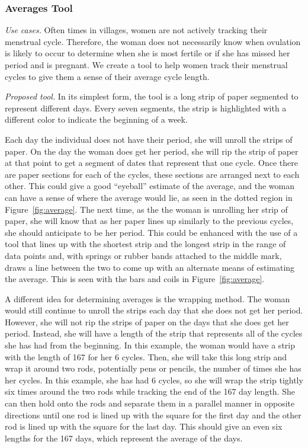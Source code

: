 \documentclass{sig-alternate}
\begin{document}
\subsubsection{Averages Tool}
\label{sec:average}

\emph{Use cases.} 
Often times in villages, women are not actively tracking their menstrual cycle. Therefore, the woman does not necessarily know when ovulation is likely to occur to determine when she is most fertile or if she has missed her period and is pregnant. We create a tool to help women track their menstrual cycles to give them a sense of their average cycle length.

\emph{Proposed tool.}
In its simplest form, the tool is a long strip of paper segmented to represent different days. Every seven segments, the strip is highlighted with a different color to indicate the beginning of a week.

Each day the individual does not have their period, she will unroll the strips of paper. 
On the day the woman does get her period, she will rip the strip of paper at that point to get a segment of dates that represent that one cycle. Once there are paper sections for each of the cycles, these sections are arranged next to each other. This could give a good ``eyeball'' estimate of the average, and the woman can have a sense of where the average would lie, as seen in the dotted region in Figure~\ref{fig:average}. The next time, as the the woman is unrolling her strip of paper, she will know that as her paper lines up similarly to the previous cycles, she should anticipate to be her period. This could be enhanced with the use of a tool that lines up with the shortest strip and the longest strip in the range of data points and, with springs or rubber bands attached to the middle mark, draws a line between the two to come up with an alternate means of estimating the average. This is seen with the bars and coils in Figure~\ref{fig:average}.

A different idea for determining averages is the wrapping method. The woman would still continue to unroll the strips each day that she does not get her period. However, she will not rip the strips of paper on the days that she does get her period. Instead, she will have a length of the strip that represents all of the cycles she has had from the beginning. In this example, the woman would have a strip with the length of 167 for her 6 cycles. Then, she will take this long strip and wrap it around two rods, potentially pens or pencils, the number of times she has her cycles. In this example, she has had 6 cycles, so she will wrap the strip tightly six times around the two rods while tracking the end of the 167 day length. She can then hold onto the rods and separate them in a parallel manner in opposite directions until one rod is lined up with the square for the first day and the other rod is lined up with the square for the last day. This should give an even six lengths for the 167 days, which represent the average of the days.
\end{document}
